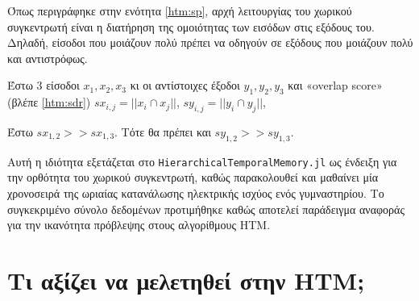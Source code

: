 Όπως περιγράφηκε στην ενότητα \ref{htm:sp}, αρχή λειτουργίας του χωρικού συγκεντρωτή είναι η διατήρηση της ομοιότητας των εισόδων στις εξόδους του.
Δηλαδή, είσοδοι που μοιάζουν πολύ πρέπει να οδηγούν σε εξόδους που μοιάζουν πολύ και αντιστρόφως.

Έστω 3 είσοδοι $x_1, x_2, x_3$ κι οι αντίστοιχες έξοδοι $y_1, y_2, y_3$
και «overlap score» (βλέπε \ref{htm:sdr}) $\mathit{sx}_{i,j}= ||x_i ∩ x_j||$, $\mathit{sy}_{i,j}= ||y_i ∩ y_j||$,

Έστω $\mathit{sx}_{1,2} >> \mathit{sx}_{1,3}$.
Τότε θα πρέπει και $\mathit{sy}_{1,2} >> \mathit{sy}_{1,3}$.

Αυτή η ιδιότητα εξετάζεται στο \texttt{HierarchicalTemporalMemory.jl} ως ένδειξη για την ορθότητα του χωρικού συγκεντρωτή,
καθώς παρακολουθεί και μαθαίνει μία χρονοσειρά της ωριαίας κατανάλωσης ηλεκτρικής ισχύος ενός γυμναστηρίου.
Το συγκεκριμένο σύνολο δεδομένων προτιμήθηκε καθώς αποτελεί παράδειγμα αναφοράς για την ικανότητα πρόβλεψης στους αλγορίθμους HTM.


\section{Τι αξίζει να μελετηθεί στην HTM;} \label{conc:study-suggestions}
